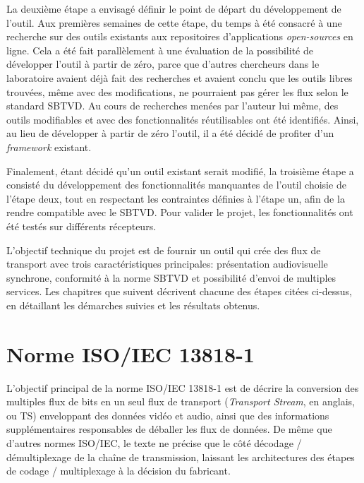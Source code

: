 \documentclass[12pt,a4paper]{article}
\begin{document}
La deuxième étape a envisagé définir le point de départ du développement de l'outil. Aux premières semaines de cette étape, du temps à été consacré à une recherche sur des outils existants aux repositoires d'applications \textit{open-sources} en ligne. Cela a été fait parallèlement à une évaluation de la possibilité de développer l'outil à partir de zéro, parce que d'autres chercheurs dans le laboratoire avaient déjà fait des recherches et avaient conclu que les outils libres trouvées, même avec des modifications, ne pourraient pas gérer les flux selon le standard SBTVD. Au cours de recherches menées par l'auteur lui même, des outils modifiables et avec des fonctionnalités réutilisables ont été identifiés. Ainsi, au lieu de développer à partir de zéro l'outil, il a été décidé de profiter d'un \textit{framework} existant.

Finalement, étant décidé qu'un outil existant serait modifié, la troisième étape a consisté du développement des fonctionnalités manquantes de l'outil choisie de l'étape deux, tout en respectant les contraintes définies à l'étape un, afin de la  rendre compatible avec le SBTVD. Pour valider le projet, les fonctionnalités ont été testés sur différents récepteurs.

L'objectif technique du projet est de fournir un outil qui crée des flux de transport avec trois caractéristiques principales: présentation audiovisuelle synchrone, conformité à la norme SBTVD et possibilité d'envoi de multiples services. Les chapitres que suivent décrivent chacune des étapes citées ci-dessus, en détaillant les démarches suivies et les résultats obtenus.

\section{Norme ISO/IEC 13818-1}
\label{iso13818}

L'objectif principal de la norme ISO/IEC 13818-1 est de décrire la conversion des multiples flux de bits en un seul flux de transport (\textit{Transport Stream}, en anglais, ou TS) enveloppant des données vidéo et audio, ainsi que des informations supplémentaires responsables de déballer les flux de données. De même que d'autres normes ISO/IEC, le texte ne précise que le côté décodage / démultiplexage de la chaîne de transmission, laissant les architectures des étapes de codage / multiplexage à la décision du fabricant.
\end{document}
